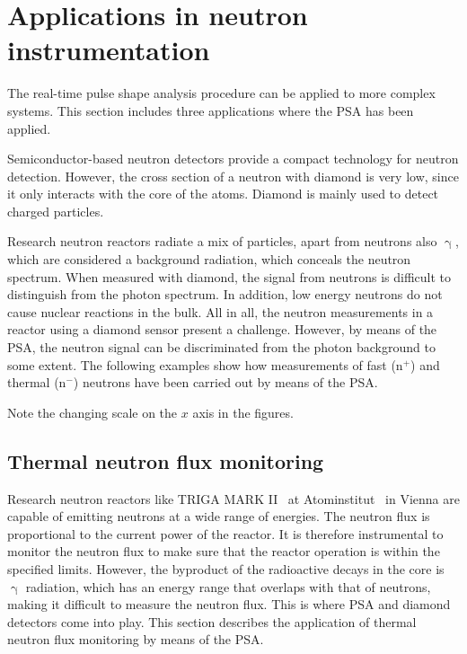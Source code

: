 \section{Applications in neutron instrumentation}
\label{sec:nm}

The real-time pulse shape analysis procedure can be applied to more complex systems. This section includes three applications where the PSA has been applied.

Semiconductor-based neutron detectors provide a compact technology for neutron detection. However, the cross section of a neutron with diamond is very low, since it only interacts with the core of the atoms. Diamond is mainly used to detect charged particles. 

Research neutron reactors radiate a mix of particles, apart from neutrons also $\upgamma$, which are considered a background radiation, which conceals the neutron spectrum. When measured with diamond, the signal from neutrons is difficult to distinguish from the photon spectrum. In addition, low energy neutrons do not cause nuclear reactions in the bulk. All in all, the neutron measurements in a reactor using a diamond sensor present a challenge. However, by means of the PSA, the neutron signal can be discriminated from the photon background to some extent. The following examples show how measurements of fast (n$^+$) and thermal (n$^-$) neutrons have been carried out by means of the PSA.

Note the changing scale on the $x$ axis in the figures.


\subsection{Thermal neutron flux monitoring}
Research neutron reactors like TRIGA MARK II~\cite{Triga:00000} at Atominstitut~\cite{AtomInst:00000} in Vienna are capable of emitting neutrons at a wide range of energies. The neutron flux is proportional to the current power of the reactor. It is therefore instrumental to monitor the neutron flux to make sure that the reactor operation is within the specified limits. However, the byproduct of the radioactive decays in the core is $\upgamma$ radiation, which has an energy range that overlaps with that of neutrons, making it difficult to measure the neutron flux. This is where PSA and diamond detectors come into play. This section describes the application of thermal neutron flux monitoring by means of the PSA.

